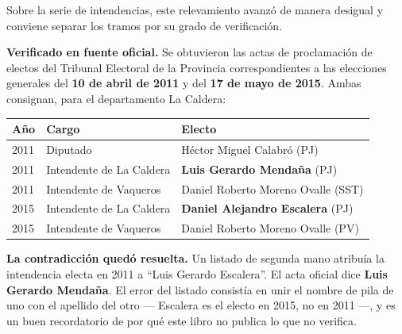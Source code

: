 \begin{cautela}
Sobre la serie de intendencias, este relevamiento avanzó de manera desigual y conviene separar los tramos por su grado de verificación.

\textbf{Verificado en fuente oficial.} Se obtuvieron las actas de proclamación de electos del Tribunal Electoral de la Provincia correspondientes a las elecciones generales del \textbf{10 de abril de 2011} y del \textbf{17 de mayo de 2015}. Ambas consignan, para el departamento La Caldera:

\begin{center}\small
\begin{tabular}{@{}lll@{}}
\toprule
\textbf{Año} & \textbf{Cargo} & \textbf{Electo} \\
\midrule
2011 & Diputado & Héctor Miguel Calabró\index{Calabró, Héctor Miguel} (PJ) \\
2011 & Intendente de La Caldera & \textbf{Luis Gerardo Mendaña\index{Mendaña, Luis Gerardo}} (PJ) \\
2011 & Intendente de Vaqueros & Daniel Roberto Moreno Ovalle\index{Moreno Ovalle, Daniel Roberto} (SST) \\
2015 & Intendente de La Caldera & \textbf{Daniel Alejandro Escalera\index{Escalera, Daniel Alejandro}} (PJ) \\
2015 & Intendente de Vaqueros & Daniel Roberto Moreno Ovalle\index{Moreno Ovalle, Daniel Roberto} (PV) \\
\bottomrule
\end{tabular}
\end{center}

\textbf{La contradicción quedó resuelta.} Un listado de segunda mano atribuía la intendencia electa en 2011 a ``Luis Gerardo Escalera''. El acta oficial dice \textbf{Luis Gerardo Mendaña}. El error del listado consistía en unir el nombre de pila de uno con el apellido del otro --- Escalera es el electo en 2015, no en 2011 ---, y es un buen recordatorio de por qué este libro no publica lo que no verifica.


\end{cautela}
